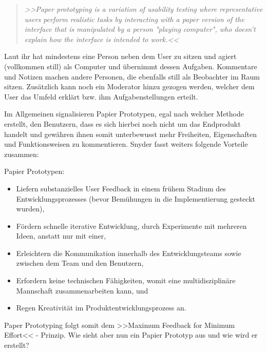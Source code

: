 \begin{quote}
	\textsl{>>Paper prototyping is a variation of usability testing where representative users perform realistic tasks by interacting with a paper version of the interface that is manipulated by a person "playing computer", who doesn't explain how the interface is intended to work.<<}
\begin{flushright}\citep{Snyder:2003}\end{flushright}
\end{quote}

Laut ihr hat mindestens eine Person neben dem User zu sitzen und agiert (vollkommen still) als Computer und übernimmt dessen Aufgaben. Kommentare und Notizen machen andere Personen, die ebenfalls still als Beobachter im Raum sitzen. Zusätzlich kann noch ein Moderator hinzu gezogen werden, welcher dem User das Umfeld erklärt bzw. ihm Aufgabenstellungen erteilt.

\medskip Im Allgemeinen signalisieren Papier Prototypen, egal nach welcher Methode erstellt, den Benutzern, dass es sich hierbei noch nicht um das Endprodukt handelt und gewähren ihnen somit unterbewusst mehr Freiheiten, Eigenschaften und Funktionsweisen zu kommentieren. Snyder fasst weiters folgende Vorteile zusammen:

\medskip Papier Prototypen:
\begin{itemize}
	\item Liefern substanzielles User Feedback in einem frühem Stadium des Entwicklungsprozesses (bevor Bemühungen in die Implementierung gesteckt wurden),
	\item Fördern schnelle iterative Entwicklung, durch Experimente mit mehreren Ideen, anstatt nur mit einer,
	\item Erleichtern die Kommunikation innerhalb des Entwicklungsteams sowie zwischen dem Team und den Benutzern,
	\item Erfordern keine technischen Fähigkeiten, womit eine multidisziplinäre Mannschaft zusammenarbeiten kann, und
	\item Regen Kreativität im Produktentwicklungsprozess an.
\end{itemize}
\begin{flushright}\citep{Snyder:2003}\end{flushright}
	
Paper Prototyping folgt somit dem >>Maximum Feedback for Minimum Effort<< - Prinzip. Wie sieht aber nun ein Papier Prototyp aus und wie wird er erstellt?

